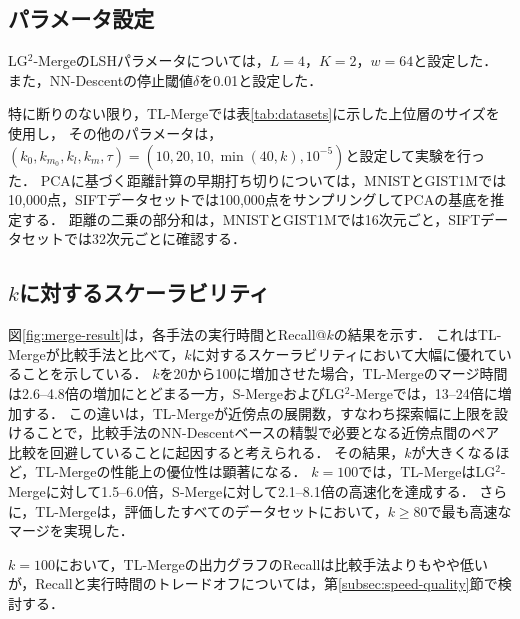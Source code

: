 \documentclass[submit,techrep,noauthor]{ipsj}
\begin{document}
\subsection{パラメータ設定}
LG$^2$-MergeのLSHパラメータについては，$L=4$，$K=2$，$w=64$と設定した．
また，NN-Descentの停止閾値$\delta$を0.01と設定した．

特に断りのない限り，TL-Mergeでは表\ref{tab:datasets}に示した上位層のサイズを使用し，
その他のパラメータは，$\left(k_0, k_{m_0}, k_l, k_m, \tau\right)=\left(10, 20, 10, \min(40, k), 10^{-5}\right)$と設定して実験を行った．
PCAに基づく距離計算の早期打ち切りについては，MNISTとGIST1Mでは10,000点，SIFTデータセットでは100,000点をサンプリングしてPCAの基底を推定する．
距離の二乗の部分和は，MNISTとGIST1Mでは16次元ごと，SIFTデータセットでは32次元ごとに確認する．

\subsection{$k$に対するスケーラビリティ}
図\ref{fig:merge-result}は，各手法の実行時間とRecall@$k$の結果を示す．
これはTL-Mergeが比較手法と比べて，$k$に対するスケーラビリティにおいて大幅に優れていることを示している．
$k$を20から100に増加させた場合，TL-Mergeのマージ時間は2.6--4.8倍の増加にとどまる一方，S-MergeおよびLG$^2$-Mergeでは，13--24倍に増加する．
この違いは，TL-Mergeが近傍点の展開数，すなわち探索幅に上限を設けることで，比較手法のNN-Descentベースの精製で必要となる近傍点間のペア比較を回避していることに起因すると考えられる．
その結果，$k$が大きくなるほど，TL-Mergeの性能上の優位性は顕著になる．
$k=100$では，TL-MergeはLG$^2$-Mergeに対して1.5--6.0倍，S-Mergeに対して2.1--8.1倍の高速化を達成する．
さらに，TL-Mergeは，評価したすべてのデータセットにおいて，$k \geq 80$で最も高速なマージを実現した．

$k=100$において，TL-Mergeの出力グラフのRecallは比較手法よりもやや低いが，Recallと実行時間のトレードオフについては，第\ref{subsec:speed-quality}節で検討する．

\end{document}
